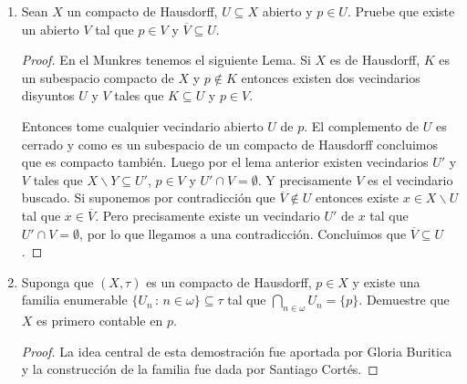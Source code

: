 \documentclass[letter,twoside,12pt]{article}
\begin{document}
\begin{enumerate}
\begin{proof}
		Ahora para probar el enunciado inicial tome cualquier vecindario $ V $ de $ Y $. Tenemos que $ Y \backslash V $ es cerrado. Luego $C = X \times (Y \backslash V) \cap G_f $ es la intersección de dos conjuntos cerrados de $ X \times Y $ y por lo tanto también es cerrado.
		
		Entonces por lo demostrado anteriormente $ \pi_X(C) $ también es cerrado. El complemento de $ \pi_X(C) $ es precisamente $ f^{-1}(V) $. $ x \in f^{-1}(V) $ es equivalente a que $ f(x) \in V $. Tenemos que $ x \times f(x) $ es la única tupla de $ x $ contenida en $ G_f $ pero $ f(x) \not \in (Y \backslash V) $. Esto equivale a que para todo $ y  \in Y $ $ x \times y \not \in C $ luego $ x \not \in \pi_X(C) $.
		
	\end{proof}
	\item Sean $ X $ un compacto de Hausdorff, $ U \subseteq X $ abierto y $ p \in U $. Pruebe que existe un abierto $ V $ tal que $ p \in V $ y $ \overline{V} \subseteq U $.
	\begin{proof}
		En el Munkres tenemos el siguiente Lema. Si $ X $ es de Hausdorff, $ K $ es un subespacio compacto de $ X $ y $ p \not \in K $ entonces existen dos vecindarios disyuntos $ U $ y $ V $ tales que $ K \subseteq U $ y $ p \in V $.
		
		Entonces tome cualquier vecindario abierto $ U $ de $ p $. El complemento de $ U $ es cerrado y como es un subespacio de un compacto de Hausdorff concluimos que es compacto también. Luego por el lema anterior existen vecindarios $ U' $ y $ V $ tales que $ X \backslash Y \subseteq U' $, $ p \in V $ y $ U' \cap V = \emptyset$. Y precisamente $ V $ es el vecindario buscado. Si suponemos por contradicción que $ \overline{V} \not \in U  $ entonces existe $ x \in X \backslash U $ tal que $ x \in \overline{V} $. Pero precisamente existe un vecindario $ U' $ de $ x $ tal que $ U' \cap V = \emptyset $, por lo que llegamos a una contradicción. Concluimos que $ \overline{V} \subseteq U $. 
	\end{proof}
	
	\item Suponga que $ (X, \tau) $ es un compacto de Hausdorff, $ p \in X $ y existe una familia enumerable $ \{U_n\,:\, n \in \omega \} \subseteq \tau $ tal que $ \bigcap_{n \in \omega}U_n =\{p\} $. Demuestre que $ X $ es primero contable en $ p $.
	
	\begin{proof}
		La idea central de esta demostración fue aportada por Gloria Buritica y la construcción de la familia fue dada por Santiago Cortés. 
		

\end{proof}
\end{enumerate}
\end{document}
